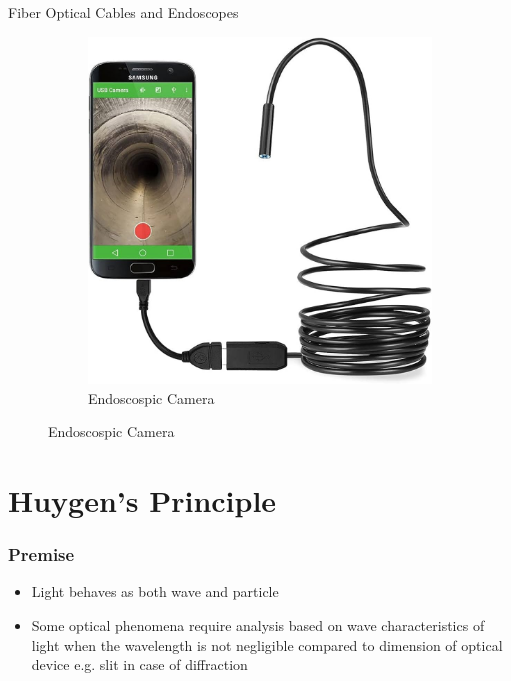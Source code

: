 \documentclass{beamer}
\begin{document}
\begin{frame}{Fiber Optical Cables and Endoscopes}
\begin{figure}
\begin{subfigure}[b]{0.3\textwidth}
			\label{Bending Direction}
		\end{subfigure}
			\hfill
			\begin{subfigure}[b]{0.3\textwidth}
				\centering
				\includegraphics[width=\textwidth]{33.jpg}
				
				\caption{Endoscospic Camera}
				\label{Bending Direction}
			\end{subfigure}
	\end{figure}

\end{frame}

\section{Huygen's Principle}

\begin{frame}
	\frametitle{Premise}
	\begin{itemize}
		\item Light behaves as both wave and particle 
		\item Some optical phenomena require analysis based on wave characteristics of light when the wavelength is not negligible compared to dimension of optical device e.g. slit in case of \alert{diffraction} 
	\end{itemize}
\end{frame}
\end{document}

